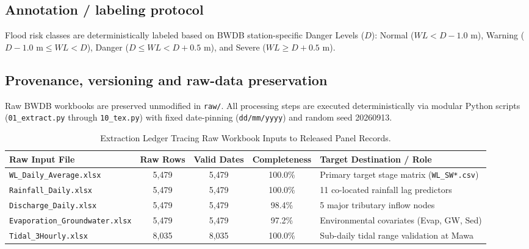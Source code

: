 \documentclass[11pt,a4paper]{article}
\begin{document}
\subsection{Annotation / labeling protocol}
Flood risk classes are deterministically labeled based on BWDB station-specific Danger Levels ($D$): Normal ($WL < D - 1.0\text{ m}$), Warning ($D - 1.0\text{ m} \le WL < D$), Danger ($D \le WL < D + 0.5\text{ m}$), and Severe ($WL \ge D + 0.5\text{ m}$).

\subsection{Provenance, versioning and raw-data preservation}
Raw BWDB workbooks are preserved unmodified in \texttt{raw/}. All processing steps are executed deterministically via modular Python scripts (\texttt{01\_extract.py} through \texttt{10\_tex.py}) with fixed date-pinning (\texttt{dd/mm/yyyy}) and random seed 20260913.

\begin{table}[htbp]\centering\scriptsize
\caption{Extraction Ledger Tracing Raw Workbook Inputs to Released Panel Records.}
\label{tab:provenance}
\begin{tabularx}{\linewidth}{|l|c|c|c|X|}
\hline
\rowcolor{wordheadbg} \textbf{Raw Input File} & \textbf{Raw Rows} & \textbf{Valid Dates} & \textbf{Completeness} & \textbf{Target Destination / Role} \\ \hline
\texttt{WL\_Daily\_Average.xlsx} & 5,479 & 5,479 & 100.0\% & Primary target stage matrix (\texttt{WL\_SW*.csv}) \\ \hline
\texttt{Rainfall\_Daily.xlsx} & 5,479 & 5,479 & 100.0\% & 11 co-located rainfall lag predictors \\ \hline
\texttt{Discharge\_Daily.xlsx} & 5,479 & 5,479 & 98.4\% & 5 major tributary inflow nodes \\ \hline
\texttt{Evaporation\_Groundwater.xlsx} & 5,479 & 5,479 & 97.2\% & Environmental covariates (Evap, GW, Sed) \\ \hline
\texttt{Tidal\_3Hourly.xlsx} & 8,035 & 8,035 & 100.0\% & Sub-daily tidal range validation at Mawa \\ \hline
\end{tabularx}
\end{table}

\clearpage

\end{document}
